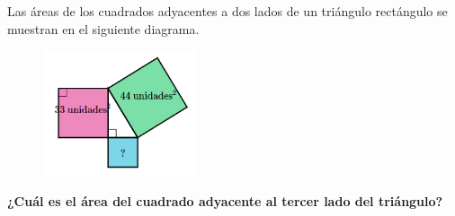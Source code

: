 Las áreas de los cuadrados adyacentes a dos lados de un triángulo rectángulo se muestran
en el siguiente diagrama.
\begin{figure}[H]
    \begin{center}
        \includegraphics[width=0.4\textwidth]{../images/area2.png}
    \end{center}
    \caption{}
    \label{fig:area2}
\end{figure}
\textbf{¿Cuál es el área del cuadrado adyacente al tercer lado del triángulo?}